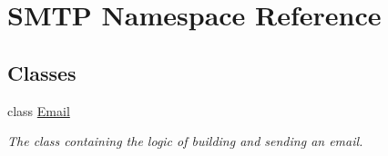 \hypertarget{namespace_s_m_t_p}{}\section{S\+M\+TP Namespace Reference}
\label{namespace_s_m_t_p}
\subsection*{Classes}
\begin{DoxyCompactItemize}
\item 
class \hyperlink{class_s_m_t_p_1_1_email}{Email}
\begin{DoxyCompactList}\small\item\em The class containing the logic of building and sending an email. \end{DoxyCompactList}\end{DoxyCompactItemize}

